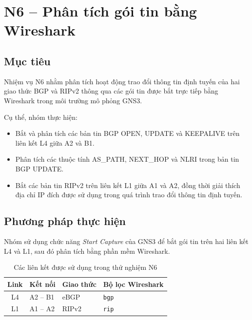 
\section{N6 -- Phân tích gói tin bằng Wireshark}

\subsection{Mục tiêu}

Nhiệm vụ N6 nhằm phân tích hoạt động trao đổi thông tin
định tuyến của hai giao thức BGP và RIPv2 thông qua
các gói tin được bắt trực tiếp bằng Wireshark trong
môi trường mô phỏng GNS3.

Cụ thể, nhóm thực hiện:
\begin{itemize}
    \item Bắt và phân tích các bản tin BGP OPEN, UPDATE
    và KEEPALIVE trên liên kết L4 giữa A2 và B1.
    
    \item Phân tích các thuộc tính AS\_PATH, NEXT\_HOP
    và NLRI trong bản tin BGP UPDATE.
    
    \item Bắt các bản tin RIPv2 trên liên kết L1 giữa
    A1 và A2, đồng thời giải thích địa chỉ IP đích
    được sử dụng trong quá trình trao đổi thông tin
    định tuyến.
\end{itemize}

\subsection{Phương pháp thực hiện}

Nhóm sử dụng chức năng \textit{Start Capture} của GNS3
để bắt gói tin trên hai liên kết L4 và L1,
sau đó phân tích bằng phần mềm Wireshark.

\begin{table}[H]
    \centering
    \caption{Các liên kết được sử dụng trong thử nghiệm N6}
    \label{tab:n6-links}
    \renewcommand{\arraystretch}{1.3}
    \begin{tabular}{|c|l|l|l|}
        \hline
        \textbf{Link} &
        \textbf{Kết nối} &
        \textbf{Giao thức} &
        \textbf{Bộ lọc Wireshark} \\
        \hline
        L4 & A2 -- B1 & eBGP & \texttt{bgp} \\
        \hline
        L1 & A1 -- A2 & RIPv2 & \texttt{rip} \\
        \hline
    \end{tabular}
\end{table}

